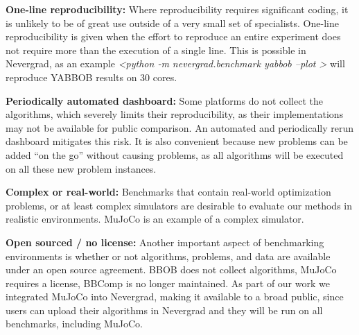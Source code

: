 \textbf{One-line reproducibility:} Where reproducibility requires significant coding, it is unlikely to be of great use outside of a very small set of specialists. One-line reproducibility is given when the effort to reproduce an entire experiment does not require more than the execution of a single line. This is possible in Nevergrad, {as an example \emph{\textless python -m nevergrad.benchmark yabbob --plot \textgreater} will reproduce YABBOB results on 30 cores}. 

\textbf{Periodically automated dashboard:} Some platforms do not collect the algorithms, which severely limits their reproducibility, as their implementations may not be available for public comparison. An automated and periodically rerun dashboard mitigates this risk. It is also convenient because new problems can be added ``on the go'' without causing problems, as all algorithms will be executed on all these new problem instances. 

\textbf{Complex or real-world:} Benchmarks that contain real-world optimization problems, or at least complex simulators are desirable to evaluate our methods in realistic environments. MuJoCo is an example of a complex simulator.


\textbf{Open sourced / no license:} Another important aspect of benchmarking environments is whether or not algorithms, problems, and data are available under an open source agreement. BBOB does not collect algorithms, MuJoCo requires a license, BBComp is no longer maintained. As part of our work we integrated MuJoCo into Nevergrad, making it available to a broad public, since users can upload their algorithms in Nevergrad and they will be run on all benchmarks, including MuJoCo.

